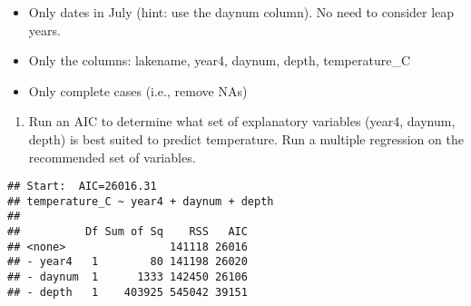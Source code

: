 \documentclass[]{article}
\newenvironment{Shaded}{\begin{snugshade}}{\end{snugshade}}
\newcommand{\CommentTok}[1]{\textcolor[rgb]{0.56,0.35,0.01}{\textit{#1}}}
\newcommand{\DataTypeTok}[1]{\textcolor[rgb]{0.13,0.29,0.53}{#1}}
\newcommand{\DecValTok}[1]{\textcolor[rgb]{0.00,0.00,0.81}{#1}}
\newcommand{\KeywordTok}[1]{\textcolor[rgb]{0.13,0.29,0.53}{\textbf{#1}}}
\newcommand{\NormalTok}[1]{#1}
\newcommand{\OperatorTok}[1]{\textcolor[rgb]{0.81,0.36,0.00}{\textbf{#1}}}
\newcommand{\StringTok}[1]{\textcolor[rgb]{0.31,0.60,0.02}{#1}}
\providecommand{\tightlist}{%
  \setlength{\itemsep}{0pt}\setlength{\parskip}{0pt}}
\begin{document}
\begin{itemize}
\tightlist
\item
  Only dates in July (hint: use the daynum column). No need to consider
  leap years.
\item
  Only the columns: lakename, year4, daynum, depth, temperature\_C
\item
  Only complete cases (i.e., remove NAs)
\end{itemize}

\begin{enumerate}
\def\labelenumi{\arabic{enumi}.}
\setcounter{enumi}{3}
\tightlist
\item
  Run an AIC to determine what set of explanatory variables (year4,
  daynum, depth) is best suited to predict temperature. Run a multiple
  regression on the recommended set of variables.
\end{enumerate}

\begin{Shaded}
\end{Shaded}

\begin{verbatim}
## Start:  AIC=26016.31
## temperature_C ~ year4 + daynum + depth
## 
##          Df Sum of Sq    RSS   AIC
## <none>                141118 26016
## - year4   1        80 141198 26020
## - daynum  1      1333 142450 26106
## - depth   1    403925 545042 39151
\end{verbatim}
\end{document}
